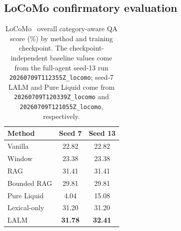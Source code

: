 \documentclass[conference]{IEEEtran}
\begin{document}
\subsection{LoCoMo confirmatory evaluation}
\begin{table}[t]
\centering
\small
\caption{LoCoMo~\cite{maharana2024locomo} overall category-aware QA score (\%) by method and training
checkpoint. The checkpoint-independent baseline values come from the
full-agent seed-13 run
\texttt{20260709T112355Z\_locomo}; seed-7 LALM and Pure Liquid come from
\texttt{20260709T120339Z\_locomo} and
\texttt{20260709T121055Z\_locomo}, respectively.}
\label{tab:locomo-overall}
\begin{tabular}{lcc}
\toprule
Method & Seed 7 & Seed 13\\
\midrule
Vanilla & 22.82 & 22.82\\
Window & 23.38 & 23.38\\
RAG & 31.41 & 31.41\\
Bounded RAG & 29.81 & 29.81\\
Pure Liquid & 4.04 & 15.08\\
Lexical-only & 31.20 & 31.20\\
LALM & \textbf{31.78} & \textbf{32.41}\\
\bottomrule
\end{tabular}
\end{table}
\end{document}
